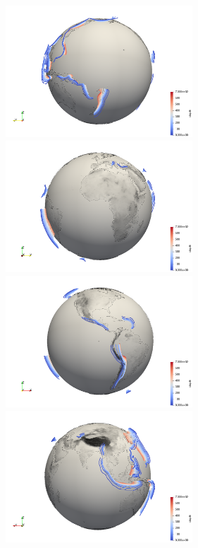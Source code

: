 \begin{center}
\includegraphics[width=7cm]{python_codes/fieldstone_136/images/view1}
\includegraphics[width=7cm]{python_codes/fieldstone_136/images/view2}\\
\includegraphics[width=7cm]{python_codes/fieldstone_136/images/view3}
\includegraphics[width=7cm]{python_codes/fieldstone_136/images/view4}
\end{center}
